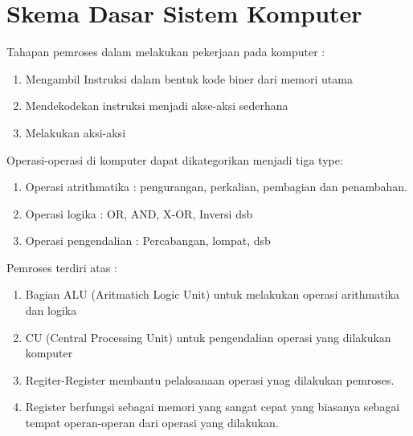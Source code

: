 \chapter{Skema Dasar Sistem Komputer}
Tahapan pemroses dalam melakukan pekerjaan pada komputer :
\begin{enumerate}
\item Mengambil Instruksi dalam bentuk kode biner dari memori utama
\item Mendekodekan instruksi menjadi akse-aksi sederhana
\item Melakukan aksi-aksi
\end{enumerate}

Operasi-operasi di komputer dapat dikategorikan menjadi tiga type:
\begin{enumerate}
\item Operasi atrithmatika	: pengurangan, perkalian, pembagian dan penambahan.
\item Operasi logika 	: OR, AND, X-OR, Inversi dsb
\item Operasi pengendalian : Percabangan, lompat, dsb
\end{enumerate}

Pemroses terdiri atas :
\begin{enumerate}
\item Bagian ALU (Aritmatich Logic Unit) untuk  melakukan operasi arithmatika dan logika 
\item CU (Central Processing Unit) untuk pengendalian operasi yang dilakukan komputer
\item Regiter-Register membantu pelaksanaan operasi ynag dilakukan pemroses.
\item Register berfungsi  sebagai memori yang sangat cepat yang biasanya sebagai tempat operan-operan dari operasi yang dilakukan.
\end{enumerate}
